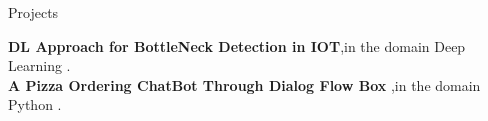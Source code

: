 \begin{rubric}{Projects}

\textbf{DL Approach for BottleNeck Detection in IOT},in the domain Deep Learning .\\
\textbf{A Pizza Ordering ChatBot Through Dialog Flow Box },in the domain Python .\\

\end{rubric}
